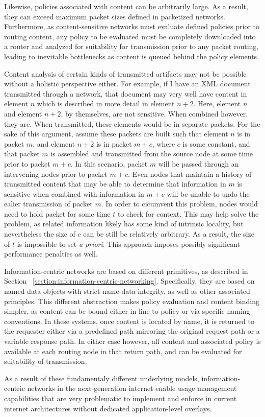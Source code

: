 Likewise, policies associated with content can be arbitrarily large.  As a result, they can exceed maximum packet sizes defined in packetized networks.  Furthermore, as content-sensitive networks must evaluate defined policies prior to routing content, any policy to be evaluated must be completely downloaded into a router and analyzed for suitability for transmission prior to any packet routing, leading to inevitable bottlenecks as content is queued behind the policy elements.

Content analysis of certain kinds of transmitted artifacts may not be possible without a holistic perspective either.  For example, if I have an XML document transmitted through a network, that document may very well have content in element $n$ which is described in more detail in element $n+2$.  Here, element $n$ and element $n+2$, by themselves, are not sensitive.  When combined however, they are.  When transmitted, these elements would be in separate packets.  For the sake of this argument, assume these packets are built such that element $n$ is in packet $m$, and element $n+2$ is in packet $m+c$, where $c$ is some constant, and that packet $m$ is assembled and transmitted from the source node at some time prior to packet $m+c$.  In this scenario, packet $m$ will be passed through an intervening nodes prior to packet $m+c$.  Even nodes that maintain a history of transmitted content that may be able to determine that information in $m$ is sensitive when combined with information in $m+c$ will be unable to undo the ealier transmission of packet $m$.  In order to cicumvent this problem, nodes would need to hold packet for some time $t$ to check for context.  This may help solve the problem, as related information likely has some kind of intrinsic locality, but nevertheless the size of $c$ can be still be relatively arbitrary.  As a result, the size of $t$ is impossible to set {\it a priori}.  This approach imposes possibly significant performance penalties as well.

Information-centric networks are based on different primitives, as described in Section ~\ref{section:information-centric-networking}.  Specifically, they are based on named data objects with strict name-data integrity, as well as other associated principles.  This different abstraction makes policy evaluation and content binding simpler, as content can be bound either in-line to policy or via specific naming conventions.  In these systems, once content is located by name, it is returned to the requester either via a predefined path mirroring the original request path or a variable response path.  In either case however, all content and associated policy is available at each routing node in that return path, and can be evaluated for suitability of transmission.

As a result of these fundamentaly different underlying models, information-centric networks in the next-generation internet enable usage management capabilities that are very problematic to implement and enforce in current internet architectures without dedicated application-level overlays.